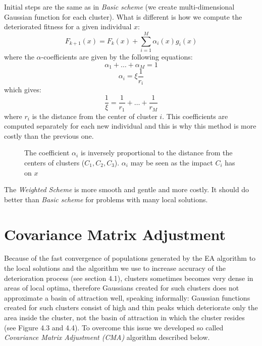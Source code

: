 Initial steps are the same as in \textit{Basic scheme} (we create 
multi-dimensional Gaussian function for each cluster). What is different
is how we compute the deteriorated fitness for a given individual $x$:
\begin{equation}
F_{k+1}(x)=F_k(x) + \sum_{i=1}^M \alpha_i(x) g_i(x)
\end{equation}
where the $\alpha$-coefficients are given by the following equations:
\begin{equation}
	\alpha_1 + \ldots + \alpha_M = 1
\end{equation}
\begin{equation}
	\alpha_i = \xi\frac{1}{r_i}
\end{equation}
which gives:
\begin{equation}
\frac{1}{\xi}=\frac{1}{r_1} + \ldots + \frac{1}{r_M}
\end{equation}
where $r_i$ is the distance from the center of cluster $i$. This coefficients
are computed separately for each new individual and this is why this method is
more costly than the previous one.
\begin{figure}
  \centering
  \caption{The coefficient $\alpha_i$ is inversely proportional to the
  distance from the centers of clusters ($C_1, C_2, C_3$). $\alpha_i$ may be
  seen as the impact $C_i$ has on $x$}
  \label{weightedScheme}
\end{figure}


The \textit{Weighted Scheme} is more smooth and gentle and more costly.
It should do better than \textit{Basic scheme} for problems with many local
solutions. 

\section{Covariance Matrix Adjustment}
Because of the fast convergence of populations
generated by the EA algorithm to the local solutions and the algorithm we use
to increase accuracy of the deterioration process (see section 4.1),
clusters sometimes becomes very dense in areas of local optima, therefore Gaussians created for such
clusters does not approximate a basin of attraction well, speaking informally:
Gaussian functions created for such clusters consist of high and thin peaks
which deteriorate only the area inside the cluster, not the basin of attraction
in which the cluster resides (see Figure 4.3 and 4.4).
To overcome this issue we developed so called \textit{Covariance Matrix
Adjustment (CMA)} algorithm described below.

